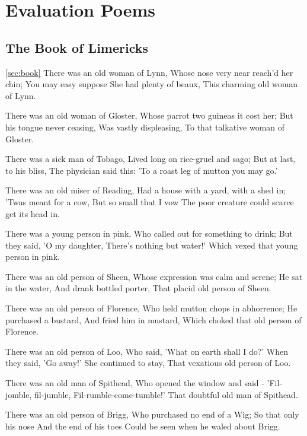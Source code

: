 \section{Evaluation Poems}

\subsection{The Book of Limericks}
\ref{sec:book}
There was an old woman of Lynn,
Whose nose very near reach'd her chin;
You may easy suppose
She had plenty of beaux,
This charming old woman of Lynn.

There was an old woman of Gloster,
Whose parrot two guineas it cost her;
But his tongue never ceasing,
Was vastly displeasing,
To that talkative woman of Gloster.

There was a sick man of Tobago,
Lived long on rice-gruel and sago;
But at last, to his bliss,
The physician said this:
'To a roast leg of mutton you may go.'

There was an old miser of Reading,
Had a house with a yard, with a shed in;
'Twas meant for a cow,
But so small that I vow
The poor creature could scarce get its head in.

There was a young person in pink,
Who called out for something to drink;
But they said, 'O my daughter,
There's nothing but water!'
Which vexed that young person in pink.

There was an old person of Sheen,
Whose expression was calm and serene;
He sat in the water,
And drank bottled porter,
That placid old person of Sheen.

There was an old person of Florence,
Who held mutton chops in abhorrence;
He purchased a bustard,
And fried him in mustard,
Which choked that old person of Florence.

There was an old person of Loo,
Who said, 'What on earth shall I do?'
When they said, 'Go away!'
She continued to stay,
That vexatious old person of Loo.

There was an old man of Spithead,
Who opened the window and said - 
'Fil-jomble, fil-jumble,
Fil-rumble-come-tumble!'
That doubtful old man of Spithead.

There was an old person of Brigg,
Who purchased no end of a Wig;
So that only his nose
And the end of his toes
Could be seen when he waled about Brigg.


